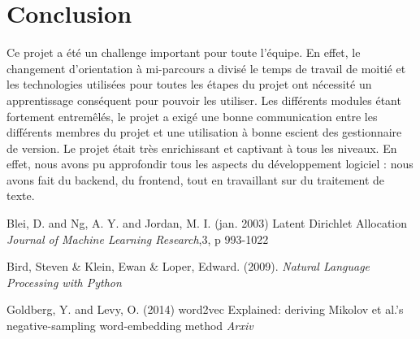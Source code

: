 \documentclass[12pt]{article}
\begin{document}
\section*{Conclusion}
\noindent
Ce projet a été un challenge important pour toute l'équipe. En effet, le changement d'orientation à mi-parcours a divisé le temps de travail de moitié et les technologies utilisées pour toutes les étapes du projet ont nécessité un apprentissage conséquent pour pouvoir les utiliser. Les différents modules étant fortement entremêlés, le projet a exigé une bonne communication entre les différents membres du projet et une utilisation à bonne escient des gestionnaire de version. Le projet était très enrichissant et captivant à tous les niveaux. En effet, nous avons pu approfondir tous les aspects du développement logiciel : nous avons fait du backend, du frontend, tout en travaillant sur du traitement de texte.













\begin{thebibliography}{9}

Blei, D. and Ng, A. Y. and Jordan, M. I. (jan. 2003)
Latent Dirichlet Allocation 
\textit{Journal of Machine Learning Research},3, p 993-1022
 
Bird, Steven & Klein, Ewan & Loper, Edward. (2009). \textit{Natural Language Processing with Python}



Goldberg, Y. and Levy, O. (2014)
word2vec Explained: deriving Mikolov et al.'s negative-sampling word-embedding method
\textit{Arxiv}
\end{thebibliography}
\end{document}
